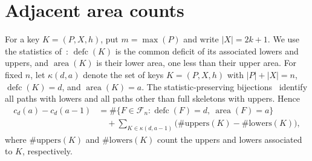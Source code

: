 \documentclass[11pt]{article}
\DeclareMathOperator{\area}{area}\DeclareMathOperator{\dinv}{dinv}
\DeclareMathOperator{\defc}{defc}\DeclareMathOperator{\sym}{sym}
\begin{document}
\section{Adjacent area counts}
For a key $K=(P,X,h)$, put $m=\max(P)$ and write $|X|=2k+1$. We use the statistics of~\cite[\S\S1.1--2]{H}: $\defc(K)$ is the common deficit of its associated lowers and uppers, and $\area(K)$ is their lower area, one less than their upper area. For fixed $n$, let $\kappa(d,a)$ denote the set of keys $K=(P,X,h)$ with $|P|+|X|=n$, $\defc(K)=d$, and $\area(K)=a$. The statistic-preserving bijections~\cite[\S1.2]{H} identify all paths with lowers and all paths other than full skeletons with uppers. Hence
\begin{equation}\label{diff}
 \begin{aligned}
 c_d(a)-c_d(a-1)&=\#\{F\in\mathcal F_n:\defc(F)=d,\ \area(F)=a\}\\
 &\quad+\sum_{K\in\kappa(d,a-1)}\bigl(\#\mathrm{uppers}(K)-\#\mathrm{lowers}(K)\bigr),
 \end{aligned}
\end{equation}
where $\#\mathrm{uppers}(K)$ and $\#\mathrm{lowers}(K)$ count the uppers and lowers associated to $K$, respectively.
\end{document}

